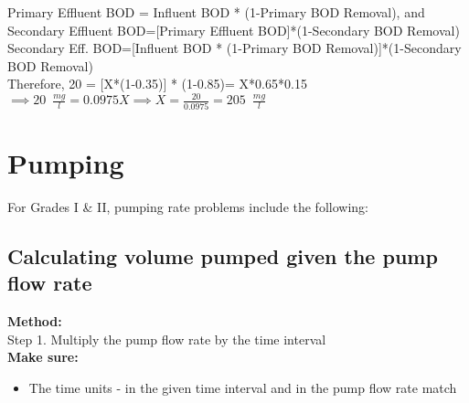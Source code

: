 \begin{enumerate}
Primary Effluent BOD = Influent BOD * (1-Primary BOD Removal), and\\
Secondary Effluent BOD=[Primary Effluent BOD]*(1-Secondary BOD Removal)\\
Secondary Eff. BOD=[Influent BOD * (1-Primary BOD Removal)]*(1-Secondary BOD Removal)\\

Therefore, 20 = [X*(1-0.35)] * (1-0.85)= X*0.65*0.15\\
$\implies 20 \enspace \frac{mg}{l}= 0.0975X \implies X=\frac{20}{0.0975}=\boxed{205 \enspace \frac{mg}{l}}$

\end{enumerate}
\chapter{Pumping}
For Grades I \& II, pumping rate problems include the following:
\section{Calculating volume pumped given the pump flow rate}

\textbf{Method:\\}
\hspace{1cm}Step 1. Multiply the pump flow rate by the time interval\\
\textbf{Make sure:}
\begin{itemize}
\item The time units - in the given time interval and in the pump flow rate match
\end{itemize}
